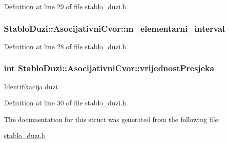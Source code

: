 Definition at line 29 of file stablo\-\_\-duzi.\-h.

\hypertarget{struct_stablo_duzi_1_1_asocijativni_cvor_a2e5d08a307d13771e0316aaa3ecabcc6}{
\subsubsection[{m\-\_\-elementarni\-\_\-interval}]{ Stablo\-Duzi\-::\-Asocijativni\-Cvor\-::m\-\_\-elementarni\-\_\-interval}}\label{struct_stablo_duzi_1_1_asocijativni_cvor_a2e5d08a307d13771e0316aaa3ecabcc6}


Definition at line 28 of file stablo\-\_\-duzi.\-h.

\hypertarget{struct_stablo_duzi_1_1_asocijativni_cvor_a47a041893c15e7cafd55d1df1c63c51d}{
\subsubsection[{vrijednost\-Presjeka}]{\setlength{\rightskip}{0pt plus 5cm}int Stablo\-Duzi\-::\-Asocijativni\-Cvor\-::vrijednost\-Presjeka}}\label{struct_stablo_duzi_1_1_asocijativni_cvor_a47a041893c15e7cafd55d1df1c63c51d}


Identifikacija duzi. 



Definition at line 30 of file stablo\-\_\-duzi.\-h.



The documentation for this struct was generated from the following file\-:\begin{DoxyCompactItemize}
\item 
\hyperlink{stablo__duzi_8h}{stablo\-\_\-duzi.\-h}\end{DoxyCompactItemize}

